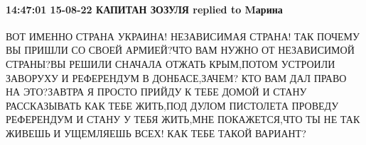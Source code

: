 
 
 
 
 

\paragraph{14:47:01 15-08-22 КАПИТАН ЗОЗУЛЯ replied to Mарина}

ВОТ ИМЕННО СТРАНА УКРАИНА! НЕЗАВИСИМАЯ СТРАНА! ТАК ПОЧЕМУ ВЫ ПРИШЛИ СО СВОЕЙ
АРМИЕЙ?ЧТО ВАМ НУЖНО ОТ НЕЗАВИСИМОЙ СТРАНЫ?ВЫ РЕШИЛИ СНАЧАЛА ОТЖАТЬ КРЫМ,ПОТОМ
УСТРОИЛИ ЗАВОРУХУ И РЕФЕРЕНДУМ В ДОНБАСЕ,ЗАЧЕМ? КТО ВАМ ДАЛ ПРАВО НА ЭТО?ЗАВТРА
Я ПРОСТО ПРИЙДУ К ТЕБЕ ДОМОЙ И СТАНУ РАССКАЗЫВАТЬ КАК ТЕБЕ ЖИТЬ,ПОД ДУЛОМ
ПИСТОЛЕТА ПРОВЕДУ РЕФЕРЕНДУМ И СТАНУ У ТЕБЯ ЖИТЬ,МНЕ ПОКАЖЕТСЯ,ЧТО ТЫ НЕ ТАК
ЖИВЕШЬ И УЩЕМЛЯЕШЬ ВСЕХ! КАК ТЕБЕ ТАКОЙ ВАРИАНТ?
